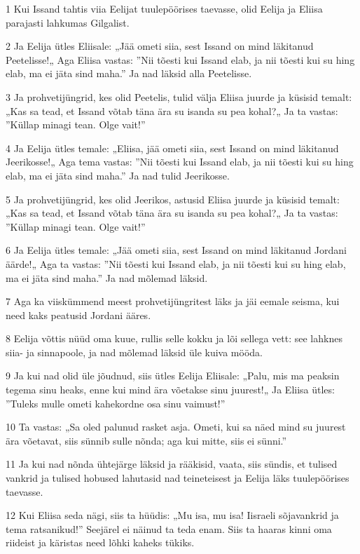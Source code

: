 \par 1 Kui Issand tahtis viia Eelijat tuulepöörises taevasse, olid Eelija ja Eliisa parajasti lahkumas Gilgalist.
\par 2 Ja Eelija ütles Eliisale: „Jää ometi siia, sest Issand on mind läkitanud Peetelisse!„ Aga Eliisa vastas: ”Nii tõesti kui Issand elab, ja nii tõesti kui su hing elab, ma ei jäta sind maha.” Ja nad läksid alla Peetelisse.
\par 3 Ja prohvetijüngrid, kes olid Peetelis, tulid välja Eliisa juurde ja küsisid temalt: „Kas sa tead, et Issand võtab täna ära su isanda su pea kohal?„ Ja ta vastas: ”Küllap minagi tean. Olge vait!”
\par 4 Ja Eelija ütles temale: „Eliisa, jää ometi siia, sest Issand on mind läkitanud Jeerikosse!„ Aga tema vastas: ”Nii tõesti kui Issand elab, ja nii tõesti kui su hing elab, ma ei jäta sind maha.” Ja nad tulid Jeerikosse.
\par 5 Ja prohvetijüngrid, kes olid Jeerikos, astusid Eliisa juurde ja küsisid temalt: „Kas sa tead, et Issand võtab täna ära su isanda su pea kohal?„ Ja ta vastas: ”Küllap minagi tean. Olge vait!”
\par 6 Ja Eelija ütles temale: „Jää ometi siia, sest Issand on mind läkitanud Jordani äärde!„ Aga ta vastas: ”Nii tõesti kui Issand elab, ja nii tõesti kui su hing elab, ma ei jäta sind maha.” Ja nad mõlemad läksid.
\par 7 Aga ka viiskümmend meest prohvetijüngritest läks ja jäi eemale seisma, kui need kaks peatusid Jordani ääres.
\par 8 Eelija võttis nüüd oma kuue, rullis selle kokku ja lõi sellega vett: see lahknes siia- ja sinnapoole, ja nad mõlemad läksid üle kuiva mööda.
\par 9 Ja kui nad olid üle jõudnud, siis ütles Eelija Eliisale: „Palu, mis ma peaksin tegema sinu heaks, enne kui mind ära võetakse sinu juurest!„ Ja Eliisa ütles: ”Tuleks mulle ometi kahekordne osa sinu vaimust!”
\par 10 Ta vastas: „Sa oled palunud rasket asja. Ometi, kui sa näed mind su juurest ära võetavat, siis sünnib sulle nõnda; aga kui mitte, siis ei sünni.”
\par 11 Ja kui nad nõnda ühtejärge läksid ja rääkisid, vaata, siis sündis, et tulised vankrid ja tulised hobused lahutasid nad teineteisest ja Eelija läks tuulepöörises taevasse.
\par 12 Kui Eliisa seda nägi, siis ta hüüdis: „Mu isa, mu isa! Iisraeli sõjavankrid ja tema ratsanikud!” Seejärel ei näinud ta teda enam. Siis ta haaras kinni oma riideist ja käristas need lõhki kaheks tükiks.
